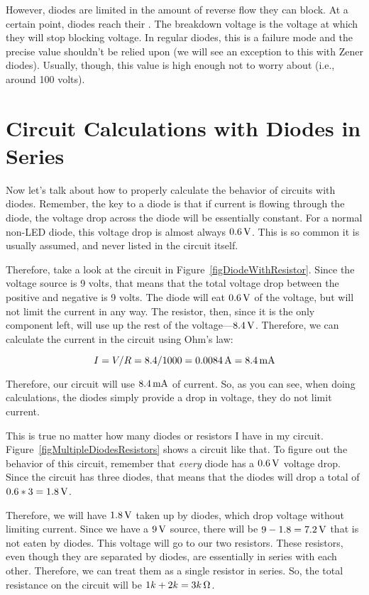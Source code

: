 However, diodes are limited in the amount of reverse flow they can block.
At a certain point, diodes reach their .
The breakdown voltage is the voltage at which they will stop blocking voltage.
In regular diodes, this is a failure mode and the precise value shouldn't be relied upon (we will see an exception to this with Zener diodes). %
Usually, though, this value is high enough not to worry about (i.e., around 100 volts).

\section{Circuit Calculations with Diodes in Series}

Now let's talk about how to properly calculate the behavior of circuits with diodes.
Remember, the key to a diode is that if current is flowing through the diode, the voltage drop across the diode will be essentially constant.
For a normal non-LED diode, this voltage drop is almost always $0.6\,\si{\volt}$.
This is so common it is usually assumed, and never listed in the circuit itself.

Therefore, take a look at the circuit in Figure~\ref{figDiodeWithResistor}.
Since the voltage source is 9 volts, that means that the total voltage drop between the positive and negative is 9 volts.
The diode will eat $0.6\,\si{\volt}$ of the voltage, but will not limit the current in any way.
The resistor, then, since it is the only component left, will use up the rest of the voltage---$8.4\,\si{\volt}$.
Therefore, we can calculate the current in the circuit using Ohm's law:

$$I = V / R = 8.4 / 1000 = 0.0084\,\si{\ampere} = 8.4\,\si{\milli\ampere}$$


Therefore, our circuit will use $8.4\,\si{\milli\ampere}$ of current.
So, as you can see, when doing calculations, the diodes simply provide a drop in voltage, they do not limit current.

This is true no matter how many diodes or resistors I have in my circuit.
Figure~\ref{figMultipleDiodesResistors} shows a circuit like that.
To figure out the behavior of this circuit, remember that \emph{every} diode has a $0.6\,\si{\volt}$ voltage drop.  Since the circuit has three diodes, that means that the diodes will drop a total of $0.6 * 3 = 1.8\,\si{\volt}$.

Therefore, we will have $1.8\,\si{\volt}$ taken up by diodes, which drop voltage without limiting current.  
Since we have a $9\,\si{\volt}$ source, there will be $9 - 1.8 = 7.2\,\si{\volt}$ that is not eaten by diodes.
This voltage will go to our two resistors.  
These resistors, even though they are separated by diodes, are essentially in series with each other.
Therefore, we can treat them as a single resistor in series.
So, the total resistance on the circuit will be $1k + 2k = 3k\,\si{\ohm}$.

